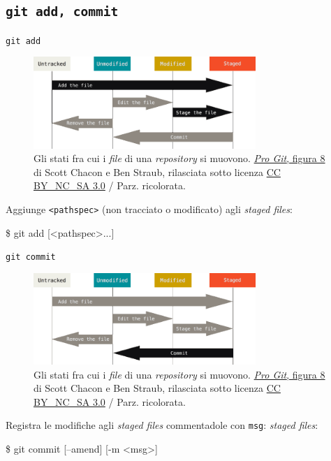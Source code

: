 \documentclass{beamer}
\begin{document}
\subsection{\texttt{git add, commit}}
\begin{frame}{\texttt{git add}}
  \begin{figure}
    \includegraphics[width=0.75\textwidth]{assets/lifecycle-add.png}
    \caption{Gli stati fra cui i \emph{file} di una \emph{repository} si
    muovono. \href{https://git-scm.com/book/en/v2/Git-Basics-Recording-Changes-to-the-Repository}{\emph{Pro Git},
    figura 8} di Scott Chacon e Ben Straub, rilasciata sotto licenza
    \href{https://creativecommons.org/licenses/by-nc-sa/3.0/}{CC
    BY\_NC\_SA 3.0} / Parz. ricolorata.}
  \end{figure}
  Aggiunge \texttt{<pathspec>} (non tracciato o modificato) agli
  \emph{staged files}:
  \begin{semiverbatim}
    \$ git add [<pathspec>...]
  \end{semiverbatim}
\end{frame}

\begin{frame}{\texttt{git commit}}
  \begin{figure}
    \includegraphics[width=0.75\textwidth]{assets/lifecycle-commit.png}
    \caption{Gli stati fra cui i \emph{file} di una \emph{repository} si
    muovono. \href{https://git-scm.com/book/en/v2/Git-Basics-Recording-Changes-to-the-Repository}{\emph{Pro Git},
    figura 8} di Scott Chacon e Ben Straub, rilasciata sotto licenza
    \href{https://creativecommons.org/licenses/by-nc-sa/3.0/}{CC
    BY\_NC\_SA 3.0} / Parz. ricolorata.}
  \end{figure}
  Registra le modifiche agli \emph{staged files} commentadole con \texttt{msg}:
  \emph{staged files}:
  \begin{semiverbatim}
    \$ git commit [--amend] [-m <msg>]
  \end{semiverbatim}
\end{frame}
\end{document}
